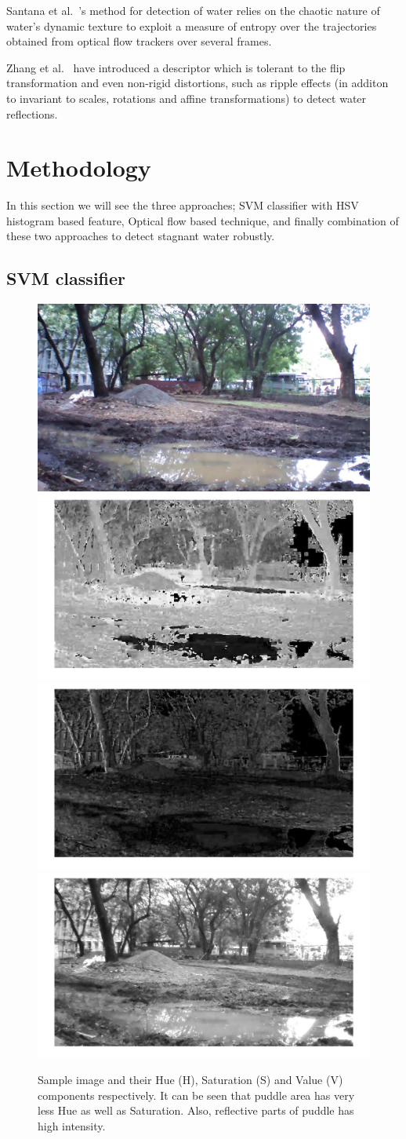 \documentclass[times,10pt,twocolumn,letterpaper]{article}
\begin{document}
Santana et al.~\cite{santana12}'s method for detection of water relies on the
chaotic nature of water’s dynamic texture to exploit a measure of entropy over the
trajectories obtained from optical flow trackers over several frames.

Zhang et al.~\cite{zhang10} have introduced a descriptor which is tolerant
to the flip transformation and even non-rigid distortions, such as ripple
effects (in additon to invariant to scales, rotations and affine
transformations) to detect water reflections.

\section{Methodology}
In this section we will see the three approaches; SVM classifier with HSV
histogram based feature, Optical flow based technique, and finally combination
of these two approaches to detect stagnant water robustly.

\subsection{SVM classifier}

\begin{figure}[h!]
\centering
\includegraphics[width=0.22\linewidth]{images/IMG_PAIR_1_1.jpg}
\includegraphics[width=0.22\linewidth]{images/IMG_PAIR_1_1_H.jpg}
\includegraphics[width=0.22\linewidth]{images/IMG_PAIR_1_1_S.jpg}
\includegraphics[width=0.22\linewidth]{images/IMG_PAIR_1_1_V.jpg}
\caption{Sample image and their Hue (H), Saturation (S) and Value (V) components
respectively. It can be seen that puddle area has very less Hue as well
as Saturation. Also, reflective parts of puddle has high intensity.}
\label{fig:HSV}
\end{figure}
\end{document}

